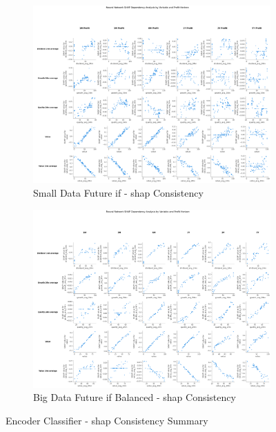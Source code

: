 \documentclass[11pt,english,a4paper,hidelinks]{book}
\begin{document}
\begin{figure}[H]
    \centering
    \begin{subfigure}{0.48\textwidth}
        \centering
        \includegraphics[width=\textwidth]{images/code/models/neural_network/binary_classifier_nn/Big Data future - IF HARD Balanced/shap_table_analysis.png}
        \caption{Small Data Future \acrshort{if} - \gls{shap} Consistency}
        \label{fig:small_binary_shap_consistency}
    \end{subfigure}
    \hfill
    \begin{subfigure}{0.48\textwidth}
        \centering
        \includegraphics[width=\textwidth]{images/code/models/neural_network/binary_classifier_nn/Big Data future - IF HARD Balanced/shap/SHAP analysis.png}
        \caption{Big Data Future \acrshort{if} Balanced - \gls{shap} Consistency}
        \label{fig:big_binary_shap_consistency}
    \end{subfigure}
    \caption{Encoder Classifier - \gls{shap} Consistency Summary}
\end{figure}
\end{document}
